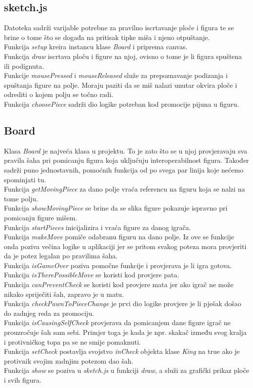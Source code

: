\documentclass[11pt]{article}
\begin{document}
\subsection{sketch.js}
Datoteka sadrži varijable potrebne za pravilno iscrtavanje ploče i figura te se brine o tome što se događa na pritisak 
tipke miša i njeno otpuštanje.\\
Funkcija \textit{setup} kreira instancu klase \textit{Board} i priprema canvas.\\
Funkcija \textit{draw} iscrtava ploču i figure na njoj, ovisno o tome je li figura spuštena ili podignuta.\\
Funkcije \textit{mousePressed} i \textit{mouseReleased} služe za prepoznavanje podizanja i spuštanja figure na polje. Moraju paziti da
se miš nalazi unutar okvira ploče i odrediti o kojem polju se točno radi.\\
Funkcija \textit{choosePiece} sadrži dio logike potreban kod promocije pijuna u figuru.\\

\subsection{Board}
Klasa \textit{Board} je najveća klasa u projektu. To je zato što se u njoj provjeravaju sva pravila šaha pri pomicanju figura koja
uključuju interoperabilnost figura. Također sadrži puno jednostavnih, pomoćnih funkcija od po svega par linija koje nećemo spominjati tu.\\
Funkcija \textit{getMovingPiece} za dano polje vraća referencu na figuru koja se nalzi na tome polju.\\
Funkcija \textit{showMovingPiece} se brine da se slika figure pokazuje ispravno pri pomicanju figure mišem.\\
Funkcija \textit{startPieces} inicijalizira i vraća figure za danog igrača.\\
Funkcija \textit{makeMove} pomiče odabranu figuru na dano polje. Iz ove se funkcije onda poziva večina logike u aplikaciji jer se pritom svakog
poteza mora provjeriti da je potez legalan po pravilima šaha.\\  
Funkcija \textit{isGameOver} poziva pomočne funkcije i provjerava je li igra gotova.
Funkcija \textit{isTherePossibleMove} se koristi kod provjere pata.\\
Funkcija \textit{canPreventCheck} se koristi kod provjere mata jer ako igrač ne može nikako spriječiti šah, zapravo je u matu.\\
Funkcija \textit{checkPawnToPieceChange} je prvi dio logike provjere je li pješak došao do zadnjeg reda za promociju. \\
Funkcija \textit{isCausingSelfCheck} provjerava da pomicanjem dane figure igrač ne prouzročuje šah sam sebi. Primjer toga je kada je
npr. skakač između svog kralja i protivničkog topa pa se ne smije pomaknuti.\\
Funkcija \textit{setCheck} postavlja svojstvo \textit{inCheck} objekta klase \textit{King} na true ako je protivnik svojim zadnjim potezom
dao šah.\\
Funkcija \textit{show} se poziva u \textit{sketch.js} u funkciji \textit{draw}, a služi za grafički prikaz ploče i svih figura. 
\end{document}
